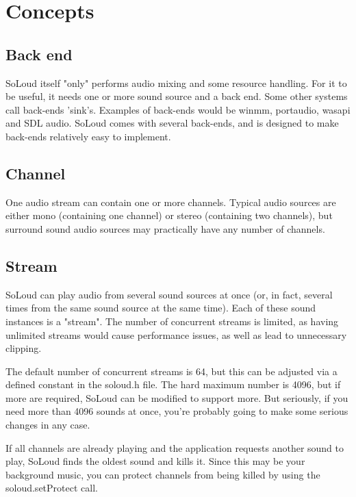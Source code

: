 
\chapter{Concepts}

\section{Back end}

SoLoud itself "only" performs audio mixing and some resource handling. For it to be useful, it needs one or more sound source and a back end. Some other systems call back-ends 'sink's. Examples of back-ends would be winmm, portaudio, wasapi and SDL audio. SoLoud comes with several back-ends, and is designed to make back-ends relatively easy to implement.

\section{Channel}

One audio stream can contain one or more channels. Typical audio sources are either mono (containing one channel) or stereo (containing two channels), but surround sound audio sources may practically have any number of channels.

\section{Stream}

SoLoud can play audio from several sound sources at once (or, in fact, several times from the same sound source at the same time). Each of these sound instances is a "stream". The number of concurrent streams is limited, as having unlimited streams would cause performance issues, as well as lead to unnecessary clipping.

The default number of concurrent streams is 64, but this can be adjusted via a defined constant in the soloud.h file. The hard maximum number is 4096, but if more are required, SoLoud can be modified to support more. But seriously, if you need more than 4096 sounds at once, you're probably going to make some serious changes in any case.

If all channels are already playing and the application requests another sound to play, SoLoud finds the oldest sound and kills it. Since this may be your background music, you can protect channels from being killed by using the soloud.setProtect call.

